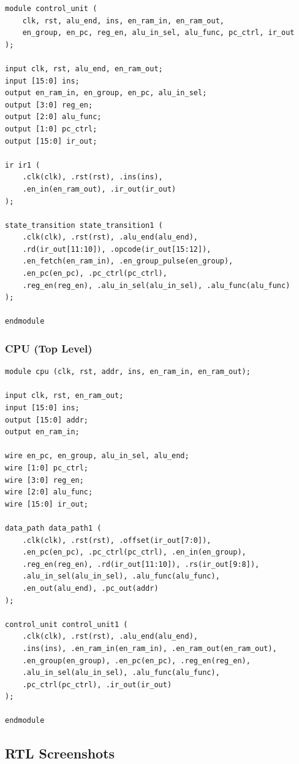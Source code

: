 \documentclass{article}
\begin{document}
\begin{lstlisting}[caption={Control Unit (control\_unit.v)}, label={lst:control}]
module control_unit (
    clk, rst, alu_end, ins, en_ram_in, en_ram_out,
    en_group, en_pc, reg_en, alu_in_sel, alu_func, pc_ctrl, ir_out
);

input clk, rst, alu_end, en_ram_out;
input [15:0] ins;
output en_ram_in, en_group, en_pc, alu_in_sel;
output [3:0] reg_en;
output [2:0] alu_func;
output [1:0] pc_ctrl;
output [15:0] ir_out;

ir ir1 (
    .clk(clk), .rst(rst), .ins(ins),
    .en_in(en_ram_out), .ir_out(ir_out)
);

state_transition state_transition1 (
    .clk(clk), .rst(rst), .alu_end(alu_end),
    .rd(ir_out[11:10]), .opcode(ir_out[15:12]),
    .en_fetch(en_ram_in), .en_group_pulse(en_group),
    .en_pc(en_pc), .pc_ctrl(pc_ctrl),
    .reg_en(reg_en), .alu_in_sel(alu_in_sel), .alu_func(alu_func)
);

endmodule
\end{lstlisting}

\subsubsection{CPU (Top Level)}

\begin{lstlisting}[caption={CPU Top Level (cpu.v)}, label={lst:cpu}]
module cpu (clk, rst, addr, ins, en_ram_in, en_ram_out);

input clk, rst, en_ram_out;
input [15:0] ins;
output [15:0] addr;
output en_ram_in;

wire en_pc, en_group, alu_in_sel, alu_end;
wire [1:0] pc_ctrl;
wire [3:0] reg_en;
wire [2:0] alu_func;
wire [15:0] ir_out;

data_path data_path1 (
    .clk(clk), .rst(rst), .offset(ir_out[7:0]),
    .en_pc(en_pc), .pc_ctrl(pc_ctrl), .en_in(en_group),
    .reg_en(reg_en), .rd(ir_out[11:10]), .rs(ir_out[9:8]),
    .alu_in_sel(alu_in_sel), .alu_func(alu_func),
    .en_out(alu_end), .pc_out(addr)
);

control_unit control_unit1 (
    .clk(clk), .rst(rst), .alu_end(alu_end),
    .ins(ins), .en_ram_in(en_ram_in), .en_ram_out(en_ram_out),
    .en_group(en_group), .en_pc(en_pc), .reg_en(reg_en),
    .alu_in_sel(alu_in_sel), .alu_func(alu_func),
    .pc_ctrl(pc_ctrl), .ir_out(ir_out)
);

endmodule
\end{lstlisting}

\subsection{RTL Screenshots}
\end{document}
